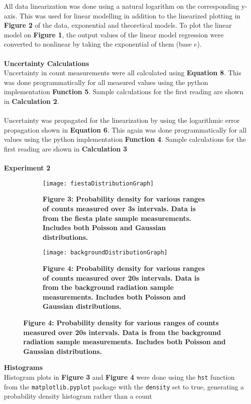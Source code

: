 \documentclass[
	letterpaper, %
	10pt, %
]{CSUniSchoolLabReport}
\begin{document}
All data linearization was done using a natural logarithm on the corresponding y-axis. This was used for
linear modelling in addition to the linearized plotting in \textbf{Figure 2} of the data, exponential and theoretical
models. To plot the linear model on \textbf{Figure 1}, the output values of the linear model regression were
converted to nonlinear by taking the exponential of them (base $e$).\\\\
{\large\textbf{Uncertainty Calculations}}\\
Uncertainty in count measurements were all calculated using \textbf{Equation 8}. This was done programmatically
for all measured values using the python implementation \textbf{Function 5}. Sample calculations for the first reading
are shown in \textbf{Calculation 2}.\\\\
Uncertainty was propagated for the linearization by using the logarithmic error propagation shown in
\textbf{Equation 6}. This again was done programmatically for all values using the python implementation \textbf{Function 4}.
Sample calculations for the first reading are shown in \textbf{Calculation 3}\\\\
{\Large\textbf{Experiment 2}}
\begin{figure}[H]
	\begin{subfigure}{0.45\textwidth}
		\texttt{[image: fiestaDistributionGraph]}
		\caption{\textbf{Figure 3: Probability density for various ranges of counts measured over 3s intervals. Data is from the fiesta plate sample measurements. Includes both Poisson and Gaussian distributions. }}
	\end{subfigure}
	\quad
	\begin{subfigure}{0.45\textwidth}
		\texttt{[image: backgroundDistributionGraph]}
		\caption{\textbf{Figure 4: Probability density for various ranges of counts measured over 20s intervals. Data is from the background radiation sample measurements. Includes both Poisson and Gaussian distributions. }}
	\end{subfigure}
\end{figure}
{\large\textbf{Histograms}}\\
Histogram plots in \textbf{Figure 3} and \textbf{Figure 4} were done using the \lstinline{hst} function from the \lstinline{matplotlib.pyplot}
package with the \lstinline{density} set to true, generating a probability density histogram rather than a count
\end{document}
